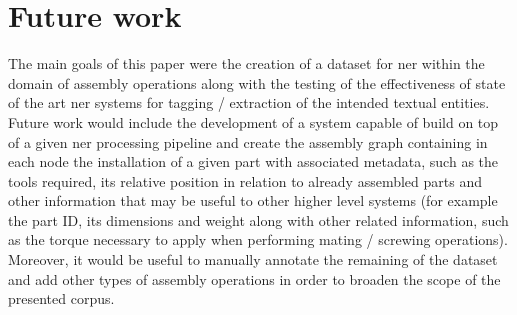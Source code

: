 \section{Future work}\label{sec:future-work}

The main goals of this paper were the creation of a dataset for \gls{ner} within the domain of assembly operations along with the testing of the effectiveness of state of the art \gls{ner} systems for tagging / extraction of the intended textual entities. Future work would include the development of a system capable of build on top of a given \gls{ner} processing pipeline and create the assembly graph containing in each node the installation of a given part with associated metadata, such as the tools required, its relative position in relation to already assembled parts and other information that may be useful to other higher level systems (for example the part ID, its dimensions and weight along with other related information, such as the torque necessary to apply when performing mating / screwing operations). Moreover, it would be useful to manually annotate the remaining of the dataset and add other types of assembly operations in order to broaden the scope of the presented corpus.
